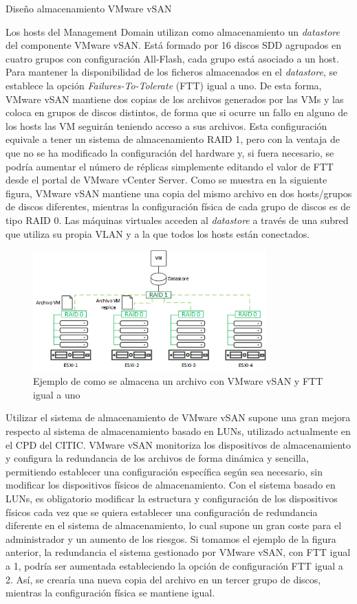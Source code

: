 \begin{subsubsection}{Diseño almacenamiento VMware vSAN}
  
  Los hosts del Management Domain utilizan como almacenamiento un \textit{datastore} del componente VMware vSAN. Está formado por 16 discos SDD agrupados en cuatro grupos con configuración All-Flash, cada grupo está asociado a un host. Para mantener la disponibilidad de los ficheros almacenados en el \textit{datastore}, se establece la opción \textit{Failures-To-Tolerate} (FTT) igual a uno. De esta forma, VMware vSAN mantiene dos copias de los archivos generados por las VMs y las coloca en grupos de discos distintos, de forma que si ocurre un fallo en alguno de los hosts las VM seguirán teniendo acceso a sus archivos. Esta configuración equivale a tener un sistema de almacenamiento RAID 1, pero con la ventaja de que no se ha modificado la configuración del hardware y, si fuera necesario, se podría aumentar el número de réplicas simplemente editando el valor de FTT desde el portal de VMware vCenter Server. Como se muestra en la siguiente figura, VMware vSAN mantiene una copia del mismo archivo en dos hosts/grupos de discos diferentes, mientras la configuración física de cada grupo de discos es de tipo RAID 0. Las máquinas virtuales acceden al \textit{datastore} a través de una subred que utiliza su propia VLAN y a la que todos los hosts están conectados.
  \begin{figure}[h]
    \centering
    \includegraphics[width=0.8\textwidth]{imaxes/pruebaconcepto/vSANconfig.png}
    \caption{Ejemplo de como se almacena un archivo con VMware vSAN y FTT igual a uno}
    \label{fig:vSAN-config-FTT}
  \end{figure}
  \FloatBarrier
  Utilizar el sistema de almacenamiento de VMware vSAN supone una gran mejora respecto al sistema de almacenamiento basado en LUNs, utilizado actualmente en el CPD del CITIC. VMware vSAN monitoriza los dispositivos de almacenamiento y configura la redundancia de los archivos de forma dinámica y sencilla, permitiendo establecer una configuración específica según sea necesario, sin modificar los dispositivos físicos de almacenamiento. Con el sistema basado en LUNs, es obligatorio modificar la estructura y configuración de los dispositivos físicos cada vez que se quiera establecer una configuración de redundancia diferente en el sistema de almacenamiento, lo cual supone un gran coste para el administrador y un aumento de los riesgos. Si tomamos el ejemplo de la figura anterior, la redundancia el sistema gestionado por VMware vSAN, con FTT igual a 1, podría ser aumentada estableciendo la opción de configuración FTT igual a 2. Así, se crearía una nueva copia del archivo en un tercer grupo de discos, mientras la configuración física se mantiene igual.

\end{subsubsection}
